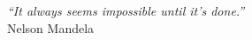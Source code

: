 \cleardoublepage
\thispagestyle{plain}

\vspace*{8cm}

\begin{flushright}
  \textsl{``It always seems impossible until it's done.''}\\
  \vspace*{0.5cm}
           Nelson Mandela
\end{flushright}
